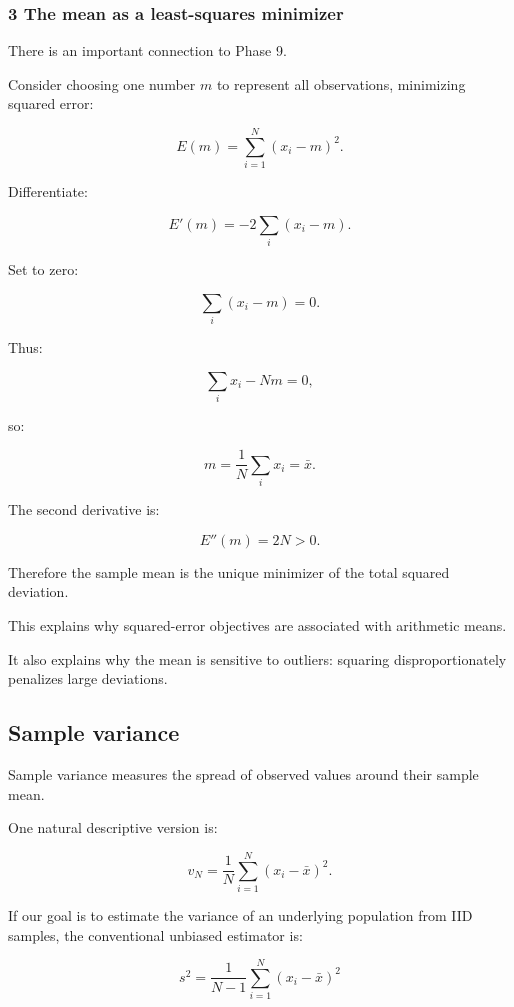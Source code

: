 \subsubsection{3 The mean as a least-squares minimizer}\label{02-foundations-ii-ch030-the-mean-as-a-least-squares-minimizer}

\hypertarget{02-foundations-ii-ch030-the-mean-as-a-least-squares-minimizer}{}

There is an important connection to Phase 9.

Consider choosing one number \(m\) to represent all observations, minimizing squared error:

\[
 E(m)= \sum_{i=1}^{N}(x_i-m)^2.
\]

Differentiate:

\[
 E'(m)= -2\sum_i(x_i-m).
\]

Set to zero:

\[
 \sum_i(x_i-m)=0.
\]

Thus:

\[
 \sum_ix_i-Nm=0,
\]

so:

\[
 \boxed{ m=\frac1N\sum_ix_i=\bar x }.
\]

The second derivative is:

\[
 E''(m)=2N>0.
\]

Therefore the sample mean is the unique minimizer of the total squared deviation.

This explains why squared-error objectives are associated with arithmetic means.

It also explains why the mean is sensitive to outliers: squaring disproportionately penalizes large deviations.

\subsection{Sample variance}\label{02-foundations-ii-ch030-sample-variance}

\hypertarget{02-foundations-ii-ch030-sample-variance}{}

Sample variance measures the spread of observed values around their sample mean.

One natural descriptive version is:

\[
 \boxed{ v_N= \frac1N \sum_{i=1}^{N}(x_i-\bar x)^2 }.
\]

If our goal is to estimate the variance of an underlying population from IID samples, the conventional unbiased estimator is:

\[
 \boxed{ s^2= \frac1{N-1} \sum_{i=1}^{N}(x_i-\bar x)^2 }
\]

